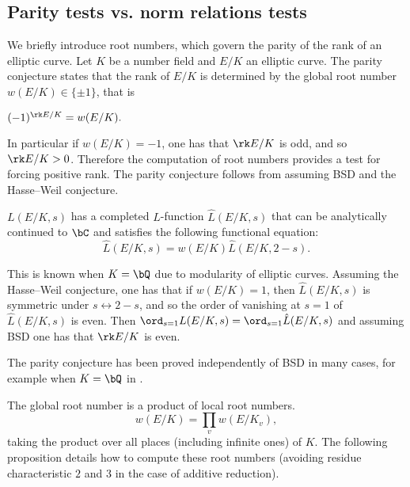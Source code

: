 \subsection{Parity tests vs. norm relations tests}

We briefly introduce root numbers, which govern the parity of the rank of an elliptic curve. Let $K$ be a number field and $E / K$ an elliptic curve. The parity conjecture states that the rank of $E / K$ is determined by the global root number $w(E / K) \in \{ \pm 1 \}$, that is

\begin{conj}\label{parity}
    $(-1)^{\rk E / K} = w(E / K).$
\end{conj}

In particular if $w(E / K) = -1$, one has that $\rk E / K$ is odd, and so $\rk E / K > 0$. Therefore the computation of root numbers provides a test for forcing positive rank. The parity conjecture follows from assuming BSD and the Hasse--Weil conjecture. 

\begin{conj}
    $L(E / K, s)$ has a completed $L$-function 
    $\hat{L}(E / K, s)$ that can be analytically continued to $\bC$ and satisfies the following functional equation:
    \[ \hat{L}(E / K, s) = w(E / K) \hat{L}(E / K, 2- s) .\]
\end{conj}

This is known when $K = \bQ$ due to modularity of elliptic curves. Assuming the Hasse--Weil conjecture, one has that if $w(E / K) = 1$, then $\hat{L}(E / K, s)$ is symmetric under $s \leftrightarrow 2 - s$, and so the order of vanishing at $s = 1$ of $\hat{L}(E / K, s)$ is even. Then $\ord_{s = 1} L(E / K, s) = \ord_{s = 1}\hat{L}(E / K, s)$ and assuming BSD one has that $\rk E / K$ is even. 
 
The parity conjecture has been proved independently of BSD in many cases, for example when $K = \bQ$ in \cite[Theorem 1.4]{DD-BSD}.


The global root number is a product of local root numbers. 
\[ w(E / K) = \prod_v w(E / K_v), \]
taking the product over all places (including infinite ones) of $K$. 
The following proposition details how to compute these root numbers (avoiding residue characteristic $2$ and $3$ in the case of additive reduction). 


